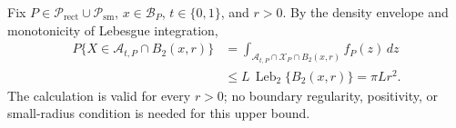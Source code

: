 Fix \(P\in\mathcal P_{\mathrm{rect}}\cup\mathcal P_{\mathrm{sm}}\), \(x\in\mathcal B_P\), \(t\in\{0,1\}\), and \(r>0\).  By the density envelope and monotonicity of Lebesgue integration,
\[
\begin{aligned}
P\{X\in\mathcal A_{t,P}\cap B_2(x,r)\}
&=\int_{\mathcal A_{t,P}\cap\mathcal X_P\cap B_2(x,r)}f_P(z)\,dz\\
&\leq L\,\operatorname{Leb}_2\{B_2(x,r)\}
=\pi Lr^2.
\end{aligned}
\]
The calculation is valid for every \(r>0\); no boundary regularity, positivity, or small-radius condition is needed for this upper bound.